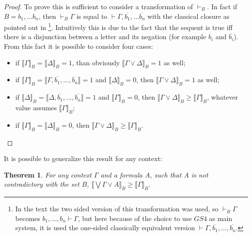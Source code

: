 \documentclass[a4paper, 12pt, oneside]{article}
\theoremstyle{plain}
\newtheorem{theorem}{Theorem}[section]
\theoremstyle{definition}
\begin{document}
\begin{proof}
	To prove this is sufficient to consider a transformation of $\vdash _B$. In fact if $B = b_1, \dots b_n$, then $\vdash_B \Gamma$ is equal to $\vdash \Gamma , \overline{b_1}, \dots \overline{b_n}$ with the classical closure as pointed out in \cite{mak:bridges}\footnote{In the text the two sided version of this transformation was used, so $\vdash_B \Gamma$ becomes $b_1, \dots,  b_n \vdash \Gamma$, but here because of the choice to use $GS4$ as main system, it is used the one-sided classically equivalent version $\vdash \Gamma, \overline{b_1}, \dots , \overline{b_n}$.}. Intuitively this is due to the fact that the sequent is true iff there is a disjunction between a letter and its negation (for example $b_i$ and $\overline{b_i}$). From this fact it is possible to consider four cases: 
	
	\begin{itemize}
		\item if $\llbracket \Gamma \rrbracket_B = \llbracket \Delta \rrbracket_B = 1$, than obviously $\llbracket \Gamma \vee \Delta \rrbracket_B = 1$ as well;
		\item if $\llbracket \Gamma \rrbracket_B = \llbracket \Gamma, \overline{b_1}, \dots , \overline{b_n} \rrbracket = 1$ and $\llbracket \Delta \rrbracket_B = 0$, then $\llbracket \Gamma \vee \Delta\rrbracket_B = 1$ as well;
		\item  if $\llbracket \Delta \rrbracket_B = \llbracket \Delta, \overline{b_1}, \dots , \overline{b_n} \rrbracket = 1$ and $\llbracket \Gamma \rrbracket_B = 0$, then  $\llbracket \Gamma \vee \Delta\rrbracket_B \geq \llbracket \Gamma \rrbracket_B$, whatever value assumes  $\llbracket \Gamma \rrbracket_B$;
		\item if $\llbracket \Gamma \rrbracket_B = \llbracket \Delta \rrbracket_B = 0$, then $\llbracket \Gamma \vee \Delta\rrbracket_B \geq \llbracket \Gamma \rrbracket_B$.
	\end{itemize}
\end{proof}

\noindent
It is possible to generalize this result for any context:

\begin{theorem}
	For any context $\Gamma$ and a formula $A$, such that $A$ is not contradictory with the set $B$, $\llbracket \bigvee \Gamma \vee A \rrbracket_B \geq \llbracket \Gamma \rrbracket_B$.
\end{theorem}
\end{document}
